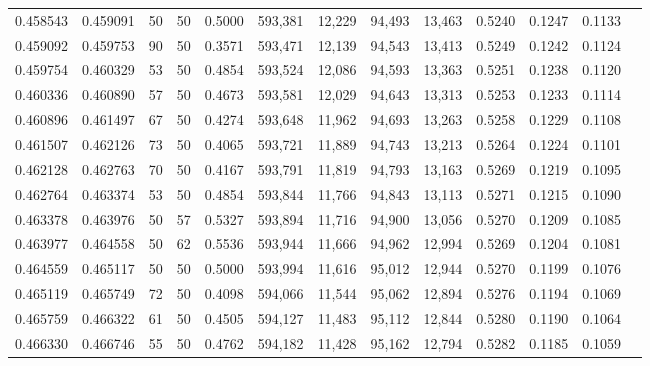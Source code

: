 \begin{tabular}{rrrrrrrrrrrrr}
0.458543 & 0.459091 &    50 &  50 &                                     0.5000 & 593,381 &  12,229 &  94,493 &  13,463 & 0.5240 & 0.1247 & 0.1133 \\
0.459092 & 0.459753 &    90 &  50 &                                     0.3571 & 593,471 &  12,139 &  94,543 &  13,413 & 0.5249 & 0.1242 & 0.1124 \\
0.459754 & 0.460329 &    53 &  50 &                                     0.4854 & 593,524 &  12,086 &  94,593 &  13,363 & 0.5251 & 0.1238 & 0.1120 \\
0.460336 & 0.460890 &    57 &  50 &                                     0.4673 & 593,581 &  12,029 &  94,643 &  13,313 & 0.5253 & 0.1233 & 0.1114 \\
0.460896 & 0.461497 &    67 &  50 &                                     0.4274 & 593,648 &  11,962 &  94,693 &  13,263 & 0.5258 & 0.1229 & 0.1108 \\
0.461507 & 0.462126 &    73 &  50 &                                     0.4065 & 593,721 &  11,889 &  94,743 &  13,213 & 0.5264 & 0.1224 & 0.1101 \\
0.462128 & 0.462763 &    70 &  50 &                                     0.4167 & 593,791 &  11,819 &  94,793 &  13,163 & 0.5269 & 0.1219 & 0.1095 \\
0.462764 & 0.463374 &    53 &  50 &                                     0.4854 & 593,844 &  11,766 &  94,843 &  13,113 & 0.5271 & 0.1215 & 0.1090 \\
0.463378 & 0.463976 &    50 &  57 &                                     0.5327 & 593,894 &  11,716 &  94,900 &  13,056 & 0.5270 & 0.1209 & 0.1085 \\
0.463977 & 0.464558 &    50 &  62 &                                     0.5536 & 593,944 &  11,666 &  94,962 &  12,994 & 0.5269 & 0.1204 & 0.1081 \\
0.464559 & 0.465117 &    50 &  50 &                                     0.5000 & 593,994 &  11,616 &  95,012 &  12,944 & 0.5270 & 0.1199 & 0.1076 \\
0.465119 & 0.465749 &    72 &  50 &                                     0.4098 & 594,066 &  11,544 &  95,062 &  12,894 & 0.5276 & 0.1194 & 0.1069 \\
0.465759 & 0.466322 &    61 &  50 &                                     0.4505 & 594,127 &  11,483 &  95,112 &  12,844 & 0.5280 & 0.1190 & 0.1064 \\
0.466330 & 0.466746 &    55 &  50 &                                     0.4762 & 594,182 &  11,428 &  95,162 &  12,794 & 0.5282 & 0.1185 & 0.1059 \\

\end{tabular}
